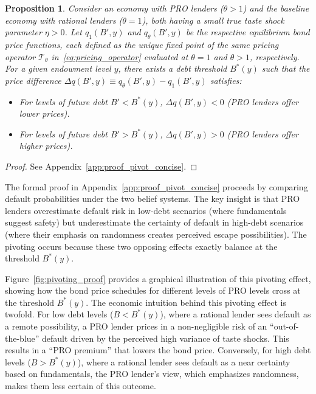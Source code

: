\documentclass[12pt]{article}
\theoremstyle{plain}
\newtheorem{proposition}{Proposition}
\begin{document}
\begin{proposition}\label{prop:pivot_concise}
	Consider an economy with PRO lenders ($\theta > 1$) and the baseline economy with rational lenders ($\theta = 1$), both having a small true taste shock parameter $\eta > 0$. Let $q_1(B', y)$ and $q_\theta(B', y)$ be the respective equilibrium bond price functions, each defined as the unique fixed point of the \emph{same} pricing operator $\mathcal T_\theta$ in~\eqref{eq:pricing_operator} evaluated at $\theta=1$ and $\theta>1$, respectively. For a given endowment level $y$, there exists a debt threshold $B^*(y)$ such that the price difference $\Delta q(B', y) \equiv q_\theta(B', y) - q_1(B', y)$ satisfies:
	\begin{itemize}
		\item For levels of future debt $B' < B^*(y)$, $\Delta q(B', y) < 0$ (PRO lenders
		      offer lower prices).
		\item For levels of future debt $B' > B^*(y)$, $\Delta q(B', y) > 0$ (PRO lenders
		      offer higher prices).
	\end{itemize}
\end{proposition}

\begin{proof}
	See Appendix~\ref{app:proof_pivot_concise}.
\end{proof}

The formal proof in Appendix~\ref{app:proof_pivot_concise} proceeds by
comparing default probabilities under the two belief systems. The key insight
is that PRO lenders overestimate default risk in low-debt scenarios (where
fundamentals suggest safety) but underestimate the certainty of default in
high-debt scenarios (where their emphasis on randomness creates perceived
escape possibilities). The pivoting occurs because these two opposing effects
exactly balance at the threshold $B^*(y)$.

Figure~\ref{fig:pivoting_proof} provides a graphical illustration of this
pivoting effect, showing how the bond price schedules for different levels of
PRO levels cross at the threshold $B^*(y)$. The economic intuition behind this
pivoting effect is twofold. For low debt levels ($B<B^*(y)$), where a rational
lender sees default as a remote possibility, a PRO lender prices in a
non-negligible risk of an ``out-of-the-blue'' default driven by the perceived
high variance of taste shocks. This results in a ``PRO premium'' that lowers
the bond price. Conversely, for high debt levels ($B>B^*(y)$), where a rational
lender sees default as a near certainty based on fundamentals, the PRO lender's
view, which emphasizes randomness, makes them less certain of this outcome.
\end{document}
